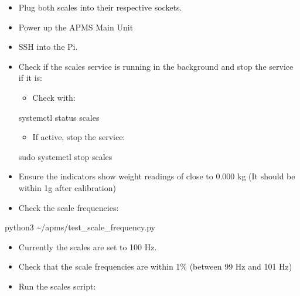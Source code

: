 \documentclass[
  letterpaper,
]{scrbook}
\newenvironment{Shaded}{\begin{snugshade}}{\end{snugshade}}
\newcommand{\ExtensionTok}[1]{\textcolor[rgb]{0.00,0.23,0.31}{#1}}
\newcommand{\FunctionTok}[1]{\textcolor[rgb]{0.28,0.35,0.67}{#1}}
\newcommand{\NormalTok}[1]{\textcolor[rgb]{0.00,0.23,0.31}{#1}}
\providecommand{\tightlist}{%
  \setlength{\itemsep}{0pt}\setlength{\parskip}{0pt}}
\begin{document}
\begin{itemize}
\item
  Plug both scales into their respective sockets.
\item
  Power up the APMS Main Unit
\item
  SSH into the Pi.
\item
  Check if the scales service is running in the background and stop the
  service if it is:

  \begin{itemize}
  \tightlist
  \item
    Check with:
  \end{itemize}

\begin{Shaded}
\begin{Highlighting}[]
\ExtensionTok{systemctl}\NormalTok{ status scales}
\end{Highlighting}
\end{Shaded}

  \begin{itemize}
  \tightlist
  \item
    If active, stop the service:
  \end{itemize}

\begin{Shaded}
\begin{Highlighting}[]
\FunctionTok{sudo}\NormalTok{ systemctl stop scales}
\end{Highlighting}
\end{Shaded}
\item
  Ensure the indicators show weight readings of close to 0.000 kg (It
  should be within 1g after calibration)
\item
  Check the scale frequencies:
\end{itemize}

\begin{Shaded}
\begin{Highlighting}[]
\ExtensionTok{python3}\NormalTok{ \textasciitilde{}/apms/test\_scale\_frequency.py}
\end{Highlighting}
\end{Shaded}

\begin{itemize}
\item
  Currently the scales are set to 100 Hz.
\item
  Check that the scale frequencies are within 1\% (between 99 Hz and 101
  Hz)
\item
  Run the scales script:
\end{itemize}
\end{document}
